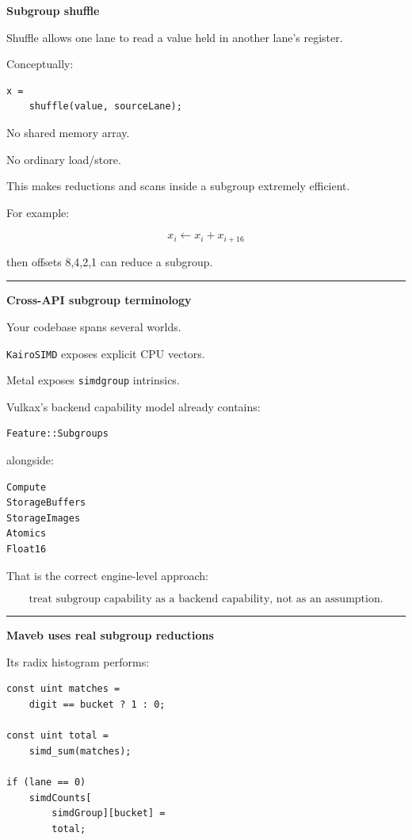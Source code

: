 \textbf{Subgroup shuffle}

Shuffle allows one lane to read a value held in another lane's register.

Conceptually:

\protect{}\label{kjzl1q}%
\begin{verbatim}
x =
    shuffle(value, sourceLane);
\end{verbatim}

No shared memory array.

No ordinary load/store.

This makes reductions and scans inside a subgroup extremely efficient.

For example:

\[
x_i
\leftarrow
x_i+x_{i+16}
\]

then offsets 8,4,2,1 can reduce a subgroup.

\begin{center}\rule{0.5\linewidth}{0.5pt}\end{center}

\textbf{Cross-API subgroup terminology}

Your codebase spans several worlds.

\texttt{KairoSIMD} exposes explicit CPU vectors.

Metal exposes \texttt{simdgroup} intrinsics.

Vulkax's backend capability model already contains:

\protect{}\label{1hu377}%
\begin{verbatim}
Feature::Subgroups
\end{verbatim}

alongside:

\protect{}\label{4aem6v}%
\begin{verbatim}
Compute
StorageBuffers
StorageImages
Atomics
Float16
\end{verbatim}

That is the correct engine-level approach:

\[
\boxed{
\text{treat subgroup capability as a backend capability, not as an assumption}.
}
\]

\begin{center}\rule{0.5\linewidth}{0.5pt}\end{center}

\textbf{Maveb uses real subgroup reductions}

Its radix histogram performs:

\protect{}\label{z1r98r}%
\begin{verbatim}
const uint matches =
    digit == bucket ? 1 : 0;

const uint total =
    simd_sum(matches);

if (lane == 0)
    simdCounts[
        simdGroup][bucket] =
        total;
\end{verbatim}

